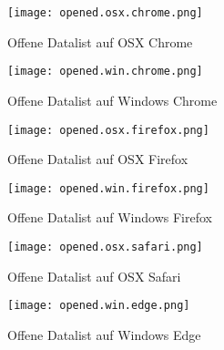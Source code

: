 
\begin{figure}[!htb]
    \centering
    \begin{minipage}[b]{0.45\textwidth}
        \centering
        \texttt{[image: opened.osx.chrome.png]}
        \caption{\centering Offene Datalist auf OSX Chrome}
        \label{img:openedOsxChromeDatalist}
    \end{minipage}
    \hfill
    \begin{minipage}[b]{0.45\textwidth}
        \centering
        \texttt{[image: opened.win.chrome.png]}
        \caption{\centering Offene Datalist auf Windows Chrome}
        \label{img:openedWinChromeDatalist}
    \end{minipage}
\end{figure}

\begin{figure}[!htb]
    \centering
    \begin{minipage}[b]{0.45\textwidth}
        \centering
        \texttt{[image: opened.osx.firefox.png]}
        \caption{\centering Offene Datalist auf OSX Firefox}
        \label{img:openedOsxFirefoxDatalist}
    \end{minipage}
    \hfill
    \begin{minipage}[b]{0.45\textwidth}
        \centering
        \texttt{[image: opened.win.firefox.png]}
        \caption{\centering Offene Datalist auf Windows Firefox}
        \label{img:openedWinFirefoxDatalist}
    \end{minipage}
\end{figure}

\begin{figure}[!htb]
    \centering
    \begin{minipage}[b]{0.5\textwidth}
        \centering
        \texttt{[image: opened.osx.safari.png]}
        \caption{\centering Offene Datalist auf OSX Safari}
        \label{img:openedOsxSafariDatalist}
    \end{minipage}
    \hfill
    \begin{minipage}[b]{0.45\textwidth}
        \centering
        \texttt{[image: opened.win.edge.png]}
        \caption{\centering Offene Datalist auf Windows Edge}
        \label{img:openedWinEdgeDatalist}
    \end{minipage}
\end{figure}

